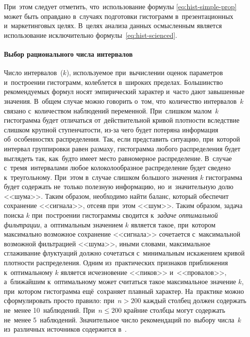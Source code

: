 \documentclass[]{scrartcl}
\begin{document}
При~этом следует отметить, что~использование формулы \ref{eq:hist-simple-prop} может быть оправдано в~случаях подготовки гистограмм в~презентационных и~маркетинговых целях. В~целях анализа данных осмысленным является использование исключительно формулы~\ref{eq:hist-scienced}.
\paragraph{Выбор рационального числа интервалов}\label{hist-number-of-k}
\par
Число интервалов~($k$), используемое при~вычислении оценок параметров и~построении гистограмм, колеблется в~широких пределах. Большинство рекомендуемых формул носят эмпирический характер и~часто дают завышенные значения. В~общем случае можно говорить о~том, что~количество интервалов~$k$ связано с~количеством наблюдений переменной. При~слишком малом~$k$ гистограмма будет отличаться от~действительной кривой плотности вследствие слишком крупной ступенчатости, из-за чего будет потеряна информация об~особенностях распределения. Так, если представить ситуацию, при~которой интервал группировки равен размаху, гистограмма любого распределения будет выглядеть так, как~будто имеет место равномерное распределение. В~случае с~тремя~интервалами любое колоколообразное распределение будет сведено к~треугольному. При~этом в~случае слишком большого значения $k$ гистограмма будет содержать не~только полезную информацию, но~и~значительную долю <<шума>>. Таким образом, необходимо найти баланс, который обеспечит сохранение <<сигнала>>, отсеяв при~этом <<шум>>. Таким образом, задача поиска $k$ при~построении гистограммы сводится к~\emph{задаче оптимальной фильтрации}, а~оптимальным значением $k$ является такое, при~котором максимально возможное сохранение <<сигнала>> сочетается с~максимальной возможной фильтрацией <<шума>>, иными словами, максимальное сглаживание флуктуаций должно сочетаться с~минимальным искажением кривой плотности распределения. Одним из~практических признаков приближения к~оптимальному $k$ является исчезновение <<пиков>> и~<<провалов>>, а~ближайшим к~оптимальному может считаться такое максимальное значение $k$, при~котором гистограмма ещё~сохраняет плавный характер. На~практике можно сформулировать просто правило: при~$n > 200$ каждый столбец должен содержать не~менее 10~наблюдений. При~$n \leq 200$ крайние столбцы могут содержать не~менее 5~наблюдений.  Значительное число рекомендаций по~выбору числа~$k$ из~различных источников содержится в~\cite{Nowiczkij:oczenka-pogresh}. 
\end{document}
